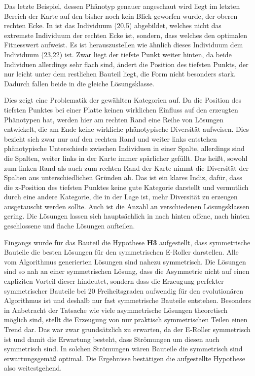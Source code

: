 
Das letzte Beispiel, dessen Phänotyp genauer angeschaut wird liegt im letzten Bereich der Karte auf den bisher noch kein Blick geworfen wurde, der oberen rechten Ecke.
In  ist das Individuum (20,5) abgebildet, welches nicht das extremste Individuum der rechten Ecke ist, sondern, dass welches den optimalen Fitnesswert aufweist.
Es ist herauszustellen wie ähnlich dieses Individuum dem Individuum (23,22) ist.
Zwar liegt der tiefste Punkt weiter hinten, da beide Individuen allerdings sehr flach sind, ändert die Position des tiefsten Punkts, der nur leicht unter dem restlichen Bauteil liegt, die Form nicht besonders stark.
Dadurch fallen beide in die gleiche Lösungsklasse.

Dies zeigt eine Problematik der gewählten Kategorien auf.
Da die Position des tiefsten Punktes bei einer Platte keinen wirklichen Einfluss auf den erzeugten Phänotypen hat, werden hier am rechten Rand eine Reihe von Lösungen entwickelt, die am Ende keine wirkliche phänotypische Diversität aufweisen.
Dies bezieht sich zwar nur auf den rechten Rand und weiter links entstehen phänotypische Unterschiede zwischen Individuen in einer Spalte, allerdings sind die Spalten, weiter links in der Karte immer spärlicher gefüllt.
Das heißt, sowohl zum linken Rand als auch zum rechten Rand der Karte nimmt die Diversität der Spalten aus unterschiedlichen Gründen ab.
Das ist ein klares Indiz, dafür, dass die x-Position des tiefsten Punktes keine gute Kategorie darstellt und vermutlich durch eine andere Kategorie, die in der Lage ist, mehr Diversität zu erzeugen ausgetauscht werden sollte.
Auch ist die Anzahl an verschiedenen Lösungsklassen gering. Die Lösungen lassen sich hauptsächlich in nach hinten offene, nach hinten geschlossene und flache Lösungen aufteilen.

Eingangs wurde für das Bauteil die Hypothese \textbf{H3} aufgestellt, dass symmetrische Bauteile die besten Lösungen für den symmetrischen E-Roller darstellen.
Alle vom Algorithmus generierten Lösungen sind nahezu symmetrisch.
Die Lösungen sind so nah an einer symmetrischen Lösung, dass die Asymmetrie nicht auf einen expliziten Vorteil dieser hindeutet, sondern dass die Erzeugung perfekter symmetrischer Bauteile bei 20 Freiheitsgraden aufwendig für den evolutionären Algorithmus ist und deshalb nur fast symmetrische Bauteile entstehen.
Besonders in Anbetracht der Tatsache wie viele asymmetrische Lösungen theoretisch möglich sind, stellt die Erzeugung von nur praktisch symmetrischen Teilen einen Trend dar.
Das war zwar grundsätzlich zu erwarten, da der E-Roller symmetrisch ist und damit die Erwartung besteht, dass Strömungen um diesen auch symmetrisch sind.
In solchen Strömungen wären Bauteile die symmetrisch sind erwartungsgemäß optimal. 
Die Ergebnisse bestätigen die aufgestellte Hypothese also weitestgehend.

